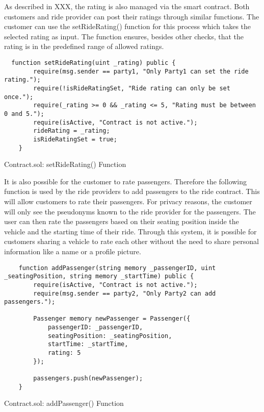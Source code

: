 As described in XXX, the rating is also managed via the smart contract. Both customers and ride provider can post their ratings through similar functions. The customer can use the setRideRating() function for this process which takes the selected rating as input.
The function ensures, besides other checks, that the rating is in the predefined range of allowed ratings. 

\lstset{
  basicstyle=\footnotesize\ttfamily,
  breaklines=true,
  numbers=left,
  firstnumber=222
}
\begin{Listing}
\begin{lstlisting}
  function setRideRating(uint _rating) public {
        require(msg.sender == party1, "Only Party1 can set the ride rating.");
        require(!isRideRatingSet, "Ride rating can only be set once.");
        require(_rating >= 0 && _rating <= 5, "Rating must be between 0 and 5.");
        require(isActive, "Contract is not active.");
        rideRating = _rating;
        isRideRatingSet = true;
    }
\end{lstlisting}
  \caption{Contract.sol: setRideRating() Function}
  \label{lst:setRideRating}
\end{Listing}

It is also possible for the customer to rate passengers. Therefore the following function is used by the ride providers to add passengers to the ride contract. This will allow customers to rate their passengers. For privacy reasons, the customer will only see the pseudonyms known to the ride provider for the passengers. The user can then rate the passengers based on their seating position inside the vehicle and the starting time of their ride. Through this system, it is possible for customers sharing a vehicle to rate each other without the need to share personal information like a name or a profile picture. 

\lstset{
  basicstyle=\footnotesize\ttfamily,
  breaklines=true,
  numbers=left,
  firstnumber=53
}

\begin{Listing}
\begin{lstlisting}
    function addPassenger(string memory _passengerID, uint _seatingPosition, string memory _startTime) public {
        require(isActive, "Contract is not active.");
        require(msg.sender == party2, "Only Party2 can add passengers.");

        Passenger memory newPassenger = Passenger({
            passengerID: _passengerID,
            seatingPosition: _seatingPosition,
            startTime: _startTime,
            rating: 5
        });

        passengers.push(newPassenger);
    }
\end{lstlisting}
  \caption{Contract.sol: addPassenger() Function}
  \label{lst:setUserCanceldRide}
\end{Listing}


